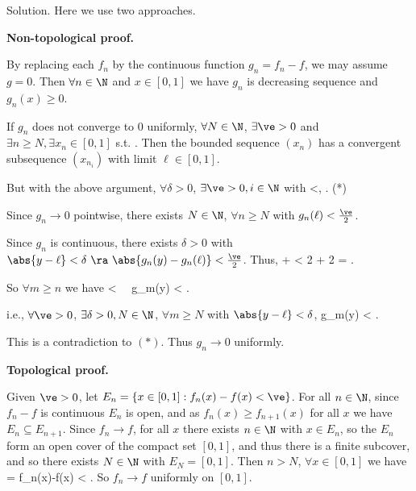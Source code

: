 Solution. Here we use two approaches.

\vspace{2mm}

{\bf Non-topological proof.} 

By replacing each $f_n$ by the continuous function $g_n = f_n -f$, we may assume $g=0$. Then $\forall n\in \N$ and $x\in [0,1]$ we have $g_n$ is decreasing sequence and $g_n(x) \geq 0$.

If $g_n$ does not converge to 0 uniformly, $\forall N\in \N$, $\exists \ve >0$ and $\exists n\geq N, \exists x_n\in [0,1]$ s.t.
\be
{} \geq \ve.
\ee  
Then the bounded sequence $(x_n)$ has a convergent subsequence $(x_{n_i})$ with limit $\ell \in [0,1]$. 

But with the above argument, $\forall \delta >0$, $\exists \ve >0, i\in \N$ with
\be
{}<\delta,\quad\quad {} \geq \ve. \quad\quad (*)
\ee

Since $g_n \to 0$ pointwise, there exists $N\in \N$, $\forall n\geq N$ with $g_n(\ell) < \frac{\ve}2$. 

Since $g_n$ is continuous, there exists $\delta > 0$ with $\abs{y-\ell} < \delta \ \ra \ \abs{g_n(y)-g_n(\ell)} < \frac {\ve}2$. Thus,
\be
{} \leq {} +  <  \frac{\ve}2 +  \frac{\ve}2 = \ve.
\ee

So $\forall m \geq n$ we have 
\be
{}< \delta \ \ra \ g_m(y) < \ve.
\ee

i.e., $\forall \ve >0$, $\exists \delta >0, N\in\N$, $\forall m \geq N$ with $\abs{y-\ell}< \delta$,
\be
g_m(y) < \ve.
\ee

This is a contradiction to $(*)$. Thus $g_n\to 0$ uniformly.

\vspace{4mm}

{\bf Topological proof.} 

Given $\ve>0$, let $E_n= \{x\in [0,1]: f_n(x)-f(x) < \ve\}$. For all $n\in\N$, since $f_n-f$ is continuous $E_n$ is open, and as $f_n(x)\geq f_{n+1}(x)$ for all $x$ we have $E_n\subseteq E_{n+1}$. Since $f_n\to f$, for all $x$ there exists $n\in \N$ with $x\in E_n$, so the $E_n$ form an open cover of the compact set $[0,1]$, and thus there is a finite subcover, and so there exists $N\in \N$ with $E_N=[0,1]$. Then $n> N$, $\forall x\in [0,1]$ we have
\be
{} = f_n(x)-f(x) < \ve.
\ee
So $f_n \to f$ uniformly on $[0,1]$.


